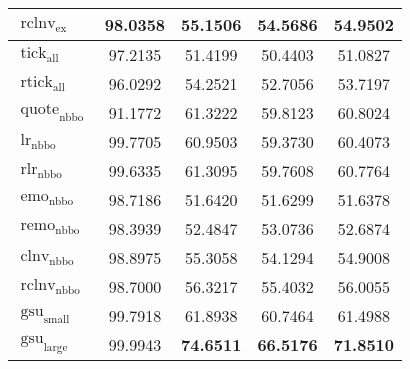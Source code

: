 \begin{table}[ht]
\begin{tabular}{lSSSS}
        $\operatorname{rclnv}_{\mathrm{ex}}$   & 98.0358           & 55.1506                            & 54.5686           & 54.9502           \\\midrule
        $\operatorname{tick}_{\mathrm{all}}$   & 97.2135           & 51.4199                            & 50.4403           & 51.0827           \\
        $\operatorname{rtick}_{\mathrm{all}}$  & 96.0292           & 54.2521                            & 52.7056           & 53.7197           \\\midrule
        $\operatorname{quote}_{\mathrm{nbbo}}$ & 91.1772           & 61.3222                            & 59.8123           & 60.8024           \\
        $\operatorname{lr}_{\mathrm{nbbo}}$    & 99.7705           & 60.9503                            & 59.3730           & 60.4073           \\
        $\operatorname{rlr}_{\mathrm{nbbo}}$   & 99.6335           & 61.3095                            & 59.7608           & 60.7764           \\
        $\operatorname{emo}_{\mathrm{nbbo}}$   & 98.7186           & 51.6420                            & 51.6299           & 51.6378           \\
        $\operatorname{remo}_{\mathrm{nbbo}}$  & 98.3939           & 52.4847                            & 53.0736           & 52.6874           \\
        $\operatorname{clnv}_{\mathrm{nbbo}}$  & 98.8975           & 55.3058                            & 54.1294           & 54.9008           \\
        $\operatorname{rclnv}_{\mathrm{nbbo}}$ & 98.7000           & 56.3217                            & 55.4032           & 56.0055           \\\midrule
        $\operatorname{gsu}_{\mathrm{small}}$  & 99.7918           & 61.8938                            & 60.7464           & 61.4988           \\
        $\operatorname{gsu}_{\mathrm{large}}$  & 99.9943 & \bfseries 74.6511                  & \bfseries 66.5176 & \bfseries 71.8510 \\\bottomrule
    \end{tabular}
\end{table}

